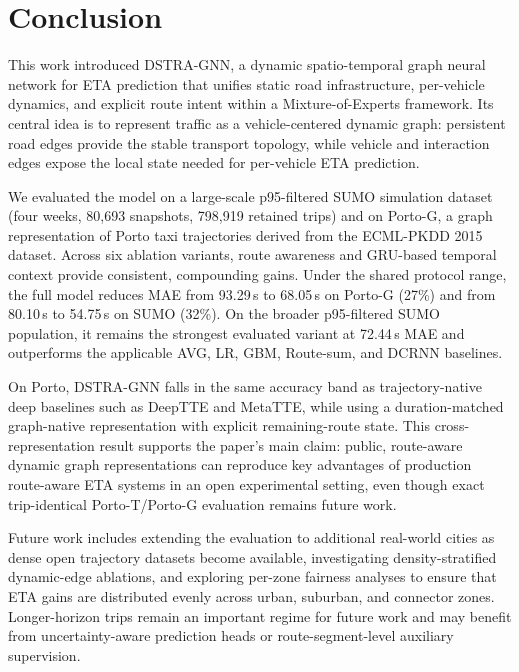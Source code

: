 \documentclass[pdflatex,sn-basic,Numbered]{sn-jnl}%
\begin{document}
\section{Conclusion}\label{sec7}

This work introduced DSTRA-GNN, a dynamic spatio-temporal graph neural network for ETA prediction that unifies static road infrastructure, per-vehicle dynamics, and explicit route intent within a Mixture-of-Experts framework. Its central idea is to represent traffic as a vehicle-centered dynamic graph: persistent road edges provide the stable transport topology, while vehicle and interaction edges expose the local state needed for per-vehicle ETA prediction.

We evaluated the model on a large-scale p95-filtered SUMO simulation dataset (four weeks, 80{,}693 snapshots, 798{,}919 retained trips) and on Porto-G, a graph representation of Porto taxi trajectories derived from the ECML-PKDD 2015 dataset. Across six ablation variants, route awareness and GRU-based temporal context provide consistent, compounding gains. Under the shared protocol range, the full model reduces MAE from 93.29\,s to 68.05\,s on Porto-G (27\%) and from 80.10\,s to 54.75\,s on SUMO (32\%). On the broader p95-filtered SUMO population, it remains the strongest evaluated variant at 72.44\,s MAE and outperforms the applicable AVG, LR, GBM, Route-sum, and DCRNN baselines.

On Porto, DSTRA-GNN falls in the same accuracy band as trajectory-native deep baselines such as DeepTTE and MetaTTE, while using a duration-matched graph-native representation with explicit remaining-route state. This cross-representation result supports the paper's main claim: public, route-aware dynamic graph representations can reproduce key advantages of production route-aware ETA systems in an open experimental setting, even though exact trip-identical Porto-T/Porto-G evaluation remains future work.

Future work includes extending the evaluation to additional real-world cities as dense open trajectory datasets become available, investigating density-stratified dynamic-edge ablations, and exploring per-zone fairness analyses to ensure that ETA gains are distributed evenly across urban, suburban, and connector zones. Longer-horizon trips remain an important regime for future work and may benefit from uncertainty-aware prediction heads or route-segment-level auxiliary supervision.

\end{document}
